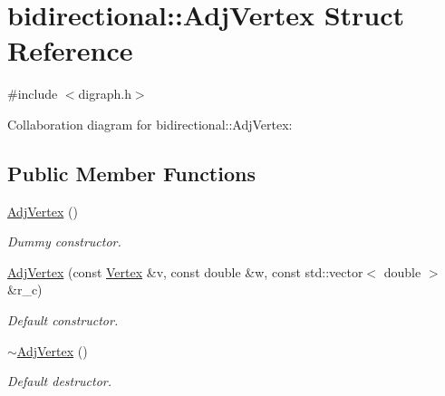 \hypertarget{structbidirectional_1_1AdjVertex}{}\section{bidirectional\+:\+:Adj\+Vertex Struct Reference}
\label{structbidirectional_1_1AdjVertex}


{\ttfamily \#include $<$digraph.\+h$>$}



Collaboration diagram for bidirectional\+:\+:Adj\+Vertex\+:
\subsection*{Public Member Functions}
\begin{DoxyCompactItemize}
\item 
\hyperlink{structbidirectional_1_1AdjVertex_ad199785e49b89a8066b7a4e73d6d9f5a}{Adj\+Vertex} ()
\begin{DoxyCompactList}\small\item\em Dummy constructor. \end{DoxyCompactList}\item 
\hyperlink{structbidirectional_1_1AdjVertex_a7ae2095e5e51da0ce10408f37e2e602c}{Adj\+Vertex} (const \hyperlink{structbidirectional_1_1Vertex}{Vertex} \&v, const double \&w, const std\+::vector$<$ double $>$ \&r\+\_\+c)
\begin{DoxyCompactList}\small\item\em Default constructor. \end{DoxyCompactList}\item 
\hyperlink{structbidirectional_1_1AdjVertex_a86d0c4e2bcd2c7915d9aa2fc5a38bd0c}{$\sim$\+Adj\+Vertex} ()
\begin{DoxyCompactList}\small\item\em Default destructor. \end{DoxyCompactList}\end{DoxyCompactItemize}
